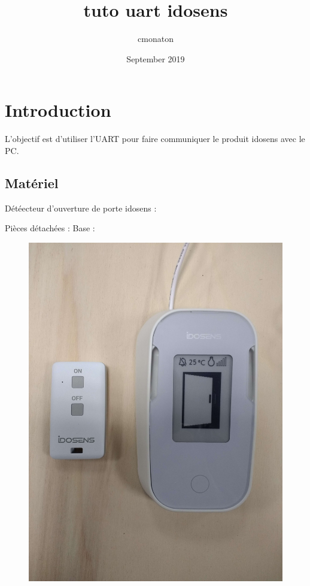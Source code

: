 \documentclass{article}
\title{tuto uart idosens}
\author{cmonaton }
\date{September 2019}
\begin{document}
\maketitle

\section{Introduction}
L'objectif est d'utiliser l'UART pour faire communiquer le produit idosens avec le PC.

\subsection{Matériel}
Détéecteur d'ouverture de porte idosens :


Pièces détachées :
Base :








\begin{figure}[H]
\begin{center}
\advance\leftskip-3cm
\advance\rightskip-3cm
\includegraphics[keepaspectratio=true,scale=0.05]{produit_complet.jpg}
\label{visina8}
\end{center}\end{figure}
\end{document}
